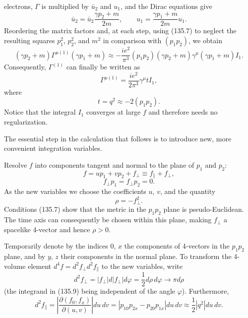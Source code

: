 electrons, $\Gamma$ is multiplied by $\bar u_2$ and $u_1$, and the Dirac equations give
\[
\bar u_2=\bar u_2\frac{\gamma p_2+m}{2m},\qquad
u_1=\frac{\gamma p_1+m}{2m}u_1.
\]
Reordering the matrix factors and, at each step, using (135.7) to neglect the resulting squares $p_1^2$, $p_2^2$, and $m^2$ in comparison with $(p_1p_2)$, we obtain
\[
(\gamma p_2+m)\Gamma^{\mu(1)}(\gamma p_1+m)
\approx-\frac{ie^2}{\pi^3}(p_1p_2)(\gamma p_2+m)\gamma^\mu(\gamma p_1+m)I_1.
\]
Consequently, $\Gamma^{(1)}$ can finally be written as
\begin{equation}
\Gamma^{\mu(1)}=\frac{ie^2}{2\pi^3}\gamma^\mu tI_1,
\tag{135.11}
\end{equation}
where
\begin{equation}
t=q^2\approx-2(p_1p_2).
\tag{135.12}
\end{equation}
Notice that the integral $I_1$ converges at large $f$ and therefore needs no regularization.

The essential step in the calculation that follows is to introduce new, more convenient integration variables.

Resolve $f$ into components tangent and normal to the plane of $p_1$ and $p_2$:
\begin{equation}
f=up_1+vp_2+f_\perp\equiv f_\parallel+f_\perp,
\tag{135.13}
\end{equation}
\begin{equation}
f_\perp p_1=f_\perp p_2=0.
\tag{135.14}
\end{equation}
As the new variables we choose the coefficients $u$, $v$, and the quantity
\begin{equation}
\rho=-f_\perp^2.
\tag{135.15}
\end{equation}
Conditions (135.7) show that the metric in the $p_1p_2$ plane is pseudo-Euclidean. The time axis can consequently be chosen within this plane, making $f_\perp$ a spacelike 4-vector and hence $\rho>0$.

Temporarily denote by the indices $0$, $x$ the components of 4-vectors in the $p_1p_2$ plane, and by $y$, $z$ their components in the normal plane. To transform the 4-volume element $d^4f=d^2f_\perp d^2f_\parallel$ to the new variables, write
\[
d^2f_\perp=|f_\perp|d|f_\perp|d\varphi=\frac12d\rho\,d\varphi\to\pi d\rho
\]
(the integrand in (135.9) being independent of the angle $\varphi$). Furthermore,
\[
d^2f_\parallel=\left|\frac{\partial(f_0,f_x)}{\partial(u,v)}\right|du\,dv
=|p_{10}p_{2x}-p_{20}p_{1x}|du\,dv\approx\frac12|q^2|du\,dv.
\]

